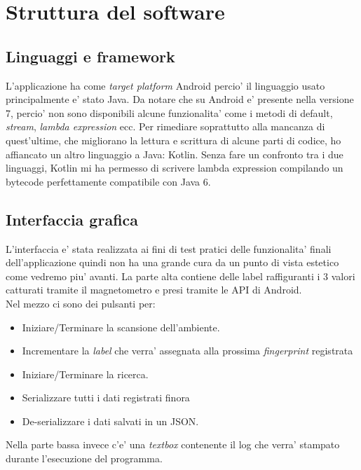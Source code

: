 \chapter*{Struttura del software}

\section*{Linguaggi e framework}
L'applicazione ha come \textit{target platform} Android percio' il linguaggio usato principalmente e' stato Java. Da notare che su Android e' presente nella versione 7, percio' non sono disponibili alcune funzionalita' come i metodi di default, \textit{stream}, \textit{lambda expression} ecc.  Per rimediare soprattutto alla mancanza di quest'ultime, che migliorano la lettura e scrittura di alcune parti di codice, ho affiancato un altro linguaggio a Java: Kotlin. Senza fare un confronto tra i due linguaggi, Kotlin mi ha permesso di scrivere lambda expression compilando un bytecode perfettamente compatibile con Java 6.

\section*{Interfaccia grafica}
L'interfaccia e' stata realizzata ai fini di test pratici delle funzionalita' finali dell'applicazione quindi non ha una grande cura da un punto di vista estetico come vedremo piu' avanti.
La parte alta contiene delle label raffiguranti i 3 valori catturati tramite il magnetometro e presi tramite le API di Android. \\
Nel mezzo ci sono dei pulsanti per:
\begin{itemize}
	\item Iniziare/Terminare la scansione dell'ambiente.
	\item Incrementare la \textit{label} che verra' assegnata alla prossima \textit{fingerprint} registrata
	\item Iniziare/Terminare la ricerca.
	\item Serializzare tutti i dati registrati finora
	\item De-serializzare i dati salvati in un JSON.
\end{itemize}
Nella parte bassa invece c'e' una \textit{textbox} contenente il log che verra' stampato durante l'esecuzione del programma.

